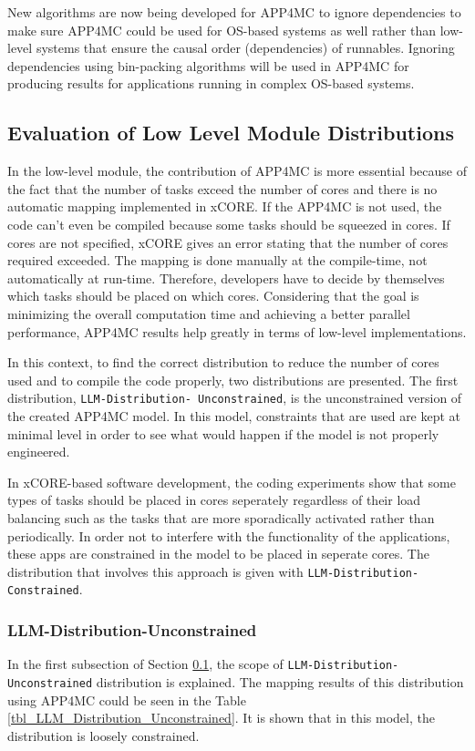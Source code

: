 New algorithms are now being developed for APP4MC to ignore dependencies to make sure APP4MC could be used for OS-based systems as well rather than low-level systems that ensure the causal order (dependencies) of runnables. Ignoring dependencies using bin-packing algorithms \cite{binpacking} will be used in APP4MC for producing results for applications running in complex OS-based systems.

\subsection{Evaluation of Low Level Module Distributions} \label{sectionlldistr}

In the low-level module, the contribution of APP4MC is more essential because of the fact that the number of tasks exceed the number of cores and there is no automatic mapping implemented in xCORE. If the APP4MC is not used, the code can't even be compiled because some tasks should be squeezed in cores. If cores are not specified, xCORE gives an error stating that the number of cores required exceeded. The mapping is done manually at the compile-time, not automatically at run-time. Therefore, developers have to decide by themselves which tasks should be placed on which cores. Considering that the goal is minimizing the overall computation time and achieving a better parallel performance, APP4MC results help greatly in terms of low-level implementations.

In this context, to find the correct distribution to reduce the number of cores used and to compile the code properly, two distributions are presented. The first distribution, \texttt{LLM-Distribution- Unconstrained}, is the unconstrained version of the created APP4MC model. In this model, constraints that are used are kept at minimal level in order to see what would happen if the model is not properly engineered. 

In xCORE-based software development, the coding experiments show that some types of tasks should be placed in cores seperately regardless of their load balancing such as the tasks that are more sporadically activated rather than periodically. In order not to interfere with the functionality of the applications, these apps are constrained in the model to be placed in seperate cores. The distribution that involves this approach is given with \texttt{LLM-Distribution- Constrained}.

\subsubsection{LLM-Distribution-Unconstrained}
In the first subsection of Section \ref{sectionlldistr}, the scope of \texttt{LLM-Distribution-Unconstrained} distribution is explained. The mapping results of this distribution using APP4MC could be seen in the Table \ref{tbl_LLM_Distribution_Unconstrained}. It is shown that in this model, the distribution is loosely constrained.

